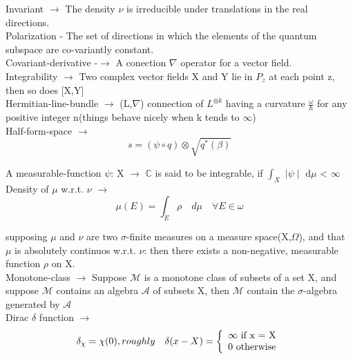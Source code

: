 \documentclass[a4paper, 10pt, onepage]{elegantbook}
\begin{document}
{Invariant $\rightarrow$ The density $\nu$ is irreducible under translations in the real directions. \\
 
Polarization\label{sec:Polarization} - The set of directions in which the elements of the quantum subspace are co-variantly constant.  \\
 
Covariant-derivative -$\rightarrow$ A conection $\nabla$ operator for a vector field.  \\
  
Integrability $\rightarrow$ Two complex vector fields X and Y lie in $P_z$ at each point z, then so does [X,Y] \\
 
Hermitian-line-bundle $\longrightarrow$ (L,$\nabla$) connection of $L^{{\otimes}{k}}$ having a curvature $\frac{\omega}{\hbar}$ for any positive integer n(things behave nicely when k tends to $\infty$)  \\

Half-form-space $\longrightarrow$
\begin{equation}
s = (\psi \circ q ) \otimes \sqrt{q^*(\beta)}
\end{equation}

A measurable-function $\psi$: X $\longrightarrow$ $\mathbb C$ is said to be integrable,
if $\int_X$ $\mid \psi \mid$ d$\mu$ < $\infty$    \\

Density of $\mu$ w.r.t. $\nu$ $\longrightarrow$
\begin{equation}
\mu(E) = \int_E \rho \quad d\mu \quad \forall E \in \omega
\end{equation}

supposing $\mu$ and $\nu$ are two $\sigma$-finite measures on a measure space(X,$\Omega$), 
and that $\mu$ is absolutely continuos w.r.t. $\nu$: then there exists a non-negative, measurable function $\rho$ on X. \\
 
Monotone-class $\longrightarrow$ Suppose $\mathscr M$ is a monotone class of subsets of a set X, and suppose $\mathscr M$ contains an
algebra $\mathscr A$ of subsets X, then $\mathscr M$ contain the $\sigma$-algebra generated by $\mathscr A$ \\
 
Dirac $\delta$ function $\longrightarrow$
\begin{equation} \label{eq:Dirac Delta Function}
\delta_\chi = \chi(0),
    roughly \quad \delta(x - X) = \left\{
    \begin{array}{ll}
    \infty \text{ if x = X} \\
    0      \text{ otherwise} \\
    \end{array} \\
    \right.
\end{equation}
 
}
\end{document}
